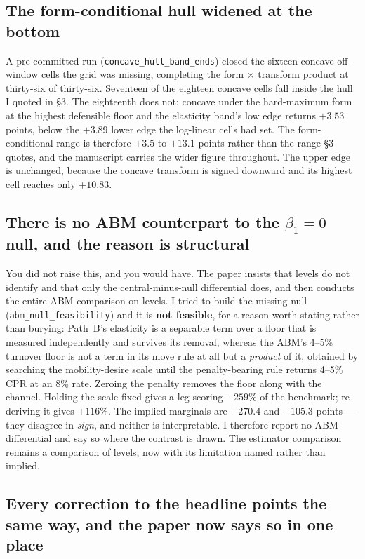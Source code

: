 \documentclass[11pt]{article}
\newcommand{\run}[1]{\texttt{#1}}
\begin{document}
\subsection{The form-conditional hull widened at the bottom}

A pre-committed run (\run{concave\_hull\_band\_ends}) closed the sixteen concave
off-window cells the grid was missing, completing the form $\times$ transform product
at thirty-six of thirty-six. Seventeen of the eighteen concave cells fall inside the
hull I quoted in \S3. The eighteenth does not: concave under the hard-maximum form at
the highest defensible floor and the elasticity band's low edge returns $+3.53$
points, below the $+3.89$ lower edge the log-linear cells had set. The
form-conditional range is therefore $+3.5$ to $+13.1$ points rather than the range
\S3 quotes, and the manuscript carries the wider figure throughout. The upper edge is unchanged,
because the concave transform is signed downward and its highest cell reaches only
$+10.83$.

\subsection{There is no ABM counterpart to the $\beta_1 = 0$ null, and the reason is
structural}

You did not raise this, and you would have. The paper insists that levels do not
identify and that only the central-minus-null differential does, and then conducts the
entire ABM comparison on levels. I tried to build the missing null
(\run{abm\_null\_feasibility}) and it is \textbf{not feasible}, for a reason worth
stating rather than burying: Path~B's elasticity is a separable term over a floor that
is measured independently and survives its removal, whereas the ABM's 4--5\%
turnover floor is not a term in its move rule at all but a \emph{product} of it,
obtained by searching the mobility-desire scale until the penalty-bearing rule returns
4--5\% CPR at an 8\% rate. Zeroing the penalty removes the floor along with the
channel. Holding the scale fixed gives a leg scoring $-259$\% of the benchmark;
re-deriving it gives $+116$\%. The implied marginals are $+270.4$ and $-105.3$ points
--- they disagree in \emph{sign}, and neither is interpretable. I therefore report no
ABM differential and say so where the contrast is drawn. The estimator comparison
remains a comparison of levels, now with its limitation named rather than implied.

\subsection{Every correction to the headline points the same way, and the paper now
says so in one place}
\end{document}
